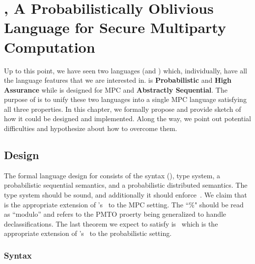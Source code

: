 \chapter{\lang, A Probabilistically Oblivious Language for Secure Multiparty Computation}
\label{ch:proposal}


Up to this point, we have seen two languages (\mpc and \obliv) which, individually, have all the language
features that we are interested in. \obliv is \textbf{Probabilistic} and \textbf{High Assurance} while \mpc
is designed for MPC and \textbf{Abstractly Sequential}. The purpose of \lang is to unify these two languages
into a single MPC language satisfying all three properties. In this chapter, we formally propose \lang and
provide sketch of how it could be designed and implemented. Along the way, we point out potential difficulties
and hypothesize about how to overcome them.

\section{Design}
\label{sec:proposal-design}

The formal language design for \lang consists of the syntax (), type system,
a probabilistic sequential semantics, and a probabilistic distributed semantics.
The type system should be sound, and additionally it should enforce~. We claim that~
is the appropriate extension of \obliv's~ to the MPC setting. The ``\%" should be read as ``modulo'' and refers
to the PMTO proerty being generalized to handle declassifications. The last theorem we expect \lang to satisfy is~
which is the appropriate extension of \mpc's~ to the probabilistic setting.


\subsection{Syntax}
\label{subsec:proposal-design-syntax}


